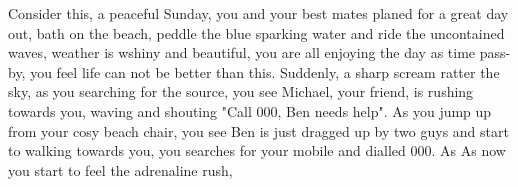Consider this, a peaceful Sunday, you and your best mates planed for a great day out, bath on the beach, peddle the blue sparking water and ride the uncontained waves, weather is wshiny and beautiful, you are all enjoying the day as time pass-by, you feel life can not be better than this. Suddenly, a sharp scream ratter the sky, as you searching for the source, you see Michael, your friend, is rushing towards you, waving and shouting "Call 000, Ben needs help". As you jump up from your cosy beach chair, you see Ben is just dragged up by two guys and start to walking towards you, you searches for your mobile and dialled 000. As As now you start to feel the adrenaline rush,  